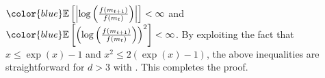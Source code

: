 \documentclass[journal]{IEEEtran}
\providecommand{\E}{\mathbb{E}} %
\renewcommand{\leq}{\leqslant} %
\DeclarePairedDelimiter{\abs}{\lvert}{\rvert}
\theoremstyle{definition}
\begin{document}
${\color{blue}\E\left[\abs*{\log\left(\frac{f(m_{t+1})}{f(m_t)}\right)}\right]}
<\infty$
and
${\color{blue}\E\left[\left(\log\left(\frac{f(m_{t+1})}{f(m_t)}\right)\right)^2\right]}
<\infty$.
%
By exploiting the fact that $x \leq \exp(x) - 1$ and $x^2 \leq 2 (\exp(x) - 1)$,
the above inequalities are straightforward for $d>3$ with .
This completes the proof. 



\end{document}
